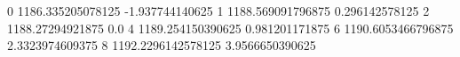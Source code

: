 0 1186.335205078125 -1.937744140625
1 1188.569091796875 0.296142578125
2 1188.27294921875 0.0
4 1189.254150390625 0.981201171875
6 1190.6053466796875 2.3323974609375
8 1192.2296142578125 3.9566650390625
